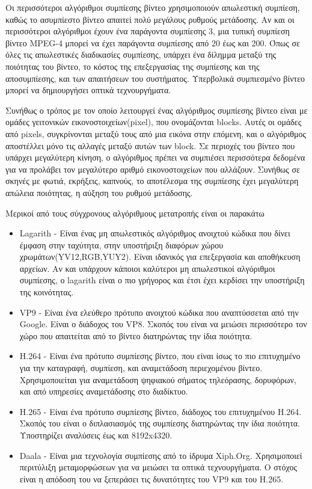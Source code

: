 Οι περισσότεροι αλγόριθμοι συμπίεσης βίντεο χρησιμοποιούν απωλεστική συμπίεση, καθώς το ασυμπίεστο βίντεο απαιτεί πολύ μεγάλους ρυθμούς μετάδοσης. Αν και οι περισσότεροι αλγόριθμοι έχουν ένα παράγοντα συμπίεσης 3, μια τυπική συμπίεση βίντεο MPEG-4 μπορεί να έχει παράγοντα συμπίεσης από 20 έως και 200. Όπως σε όλες τις απωλεστικές διαδικασίες συμπίεσης, υπάρχει ένα δίλημμα μεταξύ της ποιότητας του βίντεο, το κόστος της επεξεργασίας της συμπίεσης και της αποσυμπίεσης, και των απαιτήσεων του συστήματος. Υπερβολικά συμπιεσμένο βίντεο μπορεί να δημιουργήσει οπτικά τεχνουργήματα.

Συνήθως ο τρόπος με τον οποίο λειτουργεί ένας αλγόριθμος συμπίεσης βίντεο είναι με ομάδες γειτονικών εικονοστοιχείων(pixel), που ονομάζονται blocks. Αυτές οι ομάδες από pixels, συγκρίνονται μεταξύ τους από μια εικόνα στην επόμενη, και ο αλγόριθμος αποστέλλει μόνο τις αλλαγές μεταξύ αυτών των block. Σε περιοχές του βίντεο που υπάρχει μεγαλύτερη κίνηση, ο αλγόριθμος πρέπει να συμπιέσει περισσότερα δεδομένα για να προλάβει τον μεγαλύτερο αριθμό εικονοστοιχείων που αλλάζουν. Συνήθως σε σκηνές με φωτιά, εκρήξεις, καπνούς, το αποτέλεσμα της συμπίεσης έχει μεγαλύτερη απώλεια ποιότητας, η αύξηση του ρυθμού μετάδοσης.

Μερικοί από τους σύγχρονους αλγόριθμους μετατροπής είναι οι παρακάτω
\begin{itemize}
\item Lagarith - Είναι ένας μη απωλεστικός αλγόριθμος ανοιχτού κώδικα που δίνει έμφαση στην ταχύτητα, στην υποστήριξη διαφόρων χώρου χρωμάτων(YV12,RGB,YUY2). Είναι ιδανικός για επεξεργασία και αποθήκευση αρχείων. Αν και υπάρχουν κάποιοι καλύτεροι μη απωλεστικοί αλγόριθμοι συμπίεσης, ο lagarith είναι ο πιο γρήγορος και έτσι έχει κερδίσει την υποστήριξη της κοινότητας.
\item VP9 - Είναι ένα ελεύθερο πρότυπο ανοιχτού κώδικα που αναπτύσσεται από την Google. Είναι ο διάδοχος του VP8. Σκοπός του είναι να μειώσει περισσότερο τον χώρο που απαιτείται από το βίντεο διατηρώντας την ίδια ποιότητα. 
\item H.264 - Είναι ένα πρότυπο συμπίεσης βίντεο, που είναι ίσως το πιο επιτυχημένο για την καταγραφή, συμπίεση, και αναμετάδοση περιεχομένου βίντεο. Χρησιμοποιείται για αναμετάδοση ψηφιακού σήματος τηλεόρασης, δορυφόρων, και από υπηρεσίες αναμετάδοσης στο διαδίκτυο.
\item H.265 - Είναι ένα πρότυπο συμπίεσης βίντεο, διάδοχος του επιτυχημένου H.264. Σκοπός του είναι ο διπλασιασμός της συμπίεσης διατηρώντας την ίδια ποιότητα. Υποστηρίζει αναλύσεις έως και 8192x4320.
\item Daala - Είναι μια τεχνολογία συμπίεσης από το ίδρυμα Xiph.Org. Χρησιμοποιεί περιτύλιξη μεταμορφώσεων για να μειώσει τα οπτικά τεχνουργήματα. Ο στόχος είναι η απόδοση του να ξεπεράσει τις δυνατότητες του VP9 και του H.265. 
\end{itemize}

